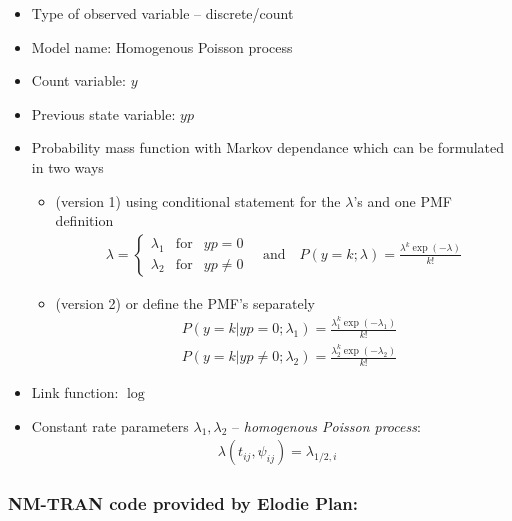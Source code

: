 \begin{itemize}
\item
Type of observed variable -- discrete/count
\item
Model name: Homogenous Poisson process
\item
Count variable: $y$
\item
Previous state variable: $yp$
\item
Probability mass function with Markov dependance which can be formulated in
two ways
\begin{itemize}
\item
(version 1) using conditional statement for the $\lambda$'s and one PMF definition
\begin{align}
 \lambda = \left\{ \begin{array}{rcl}
			\lambda_1 & \mbox{for} & yp = 0 \\
			\lambda_2 & \mbox{for} & yp \neq 0 \nonumber
\end{array}\right. 
\quad \text{and} \quad P(y=k; \lambda) = \frac{\lambda^k \exp(-\lambda)}{k!} \nonumber
\end{align}
\item
(version 2) or define the PMF's separately 
\begin{align}
& P(y=k | yp=0; \lambda_1) = \frac{\lambda_1^k \exp(-\lambda_1)}{k!} \nonumber \\
& P(y=k | yp \neq 0; \lambda_2) = \frac{\lambda_2^k \exp(-\lambda_2)}{k!} \nonumber 
\end{align}
\end{itemize}
\item
Link function: $\log$
\item
Constant rate parameters $\lambda_1,\lambda_2$ -- \emph{homogenous Poisson process}:
\begin{eqnarray}
& \lambda(t_{ij}, \psi_{ij}) = \lambda_{1/2,i} \nonumber
\end{eqnarray}
\end{itemize}


\subsubsection{NM-TRAN code provided by Elodie Plan:}

\myStartLine

